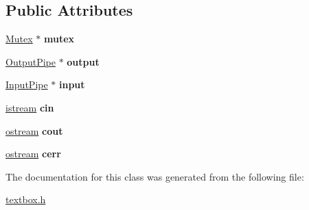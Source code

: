 \subsection*{Public Attributes}
\begin{DoxyCompactItemize}
\item 
\mbox{\label{a00032_ac21d0f2a85262aa622fb31bef2370139}} 
\hyperlink{a00036}{Mutex} $\ast$ {\bfseries mutex}
\item 
\mbox{\label{a00032_a0b732f6f64029291a7f756f8bcfc85b6}} 
\hyperlink{a00040}{Output\+Pipe} $\ast$ {\bfseries output}
\item 
\mbox{\label{a00032_aa1cea72263f267f73fb61ec4d807fd68}} 
\hyperlink{a00044}{Input\+Pipe} $\ast$ {\bfseries input}
\item 
\mbox{\label{a00032_aa21ac76f8ec37149bc6349ef7a111ec1}} 
\hyperlink{a00028}{istream} {\bfseries cin}
\item 
\mbox{\label{a00032_a6593b812c31f434952d5f1e641b35ce0}} 
\hyperlink{a00024}{ostream} {\bfseries cout}
\item 
\mbox{\label{a00032_a9c4b838413838baf7c20c01f2a8ca373}} 
\hyperlink{a00024}{ostream} {\bfseries cerr}
\end{DoxyCompactItemize}


The documentation for this class was generated from the following file\+:\begin{DoxyCompactItemize}
\item 
\hyperlink{a00005}{textbox.\+h}\end{DoxyCompactItemize}
